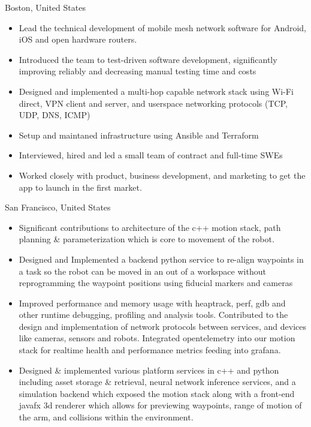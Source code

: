 \documentclass[10pt,a4paper,ragged2e,withhyper]{altacv}
\begin{document}
\begin{paracol}{2}

 {Boston, United States}
\begin{itemize}
\item Lead the technical development of mobile mesh network software for Android, iOS and open hardware routers.
\item Introduced the team to test-driven software development, significantly improving reliably and decreasing manual testing time and costs
\item Designed and implemented a multi-hop capable network stack using Wi-Fi direct, VPN client and server, and userspace networking protocols (TCP, UDP, DNS, ICMP)
\item Setup and maintaned infrastructure using Ansible and Terraform
\item Interviewed, hired and led a small team of contract and full-time SWEs
\item Worked closely with product, business development, and marketing to get the app to launch in the first market.
\end{itemize}

 {San Francisco, United States}
\begin{itemize}
\item Significant contributions to architecture of the c++ motion stack, path planning \& parameterization which is core to movement of the robot. 
\item Designed and Implemented a backend python service to re-align waypoints in a task so the robot can be moved in an out of a workspace without reprogramming the waypoint positions using fiducial markers and cameras
\item Improved performance and memory usage with heaptrack, perf, gdb and other runtime debugging, profiling and analysis tools. Contributed to the design and implementation of network protocols between services, and devices like cameras, sensors and robots. Integrated opentelemetry into our motion stack for realtime health and performance metrics feeding into grafana.
\item Designed \& implemented various platform services in c++ and python including asset storage \& retrieval, neural network inference services, and a simulation backend which exposed the motion stack along with a front-end javafx 3d renderer which allows for previewing waypoints, range of motion of the arm, and  collisions within the environment.
\end{itemize}


\end{paracol}
\end{document}
